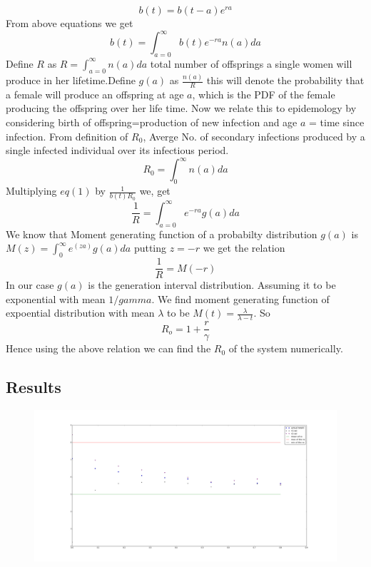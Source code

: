 \documentclass{article}
\begin{document}
$$b(t)=b(t-a)e^{ra}$$
From above equations we get
\begin{equation}
b(t)=\int_{a=0}^{\infty}b(t)e^{-ra}n(a)da
\end{equation}
Define $R$ as
$R=\int_{a=0}^{\infty}n(a)da$ total number of offsprings a single
women will produce in her lifetime.\newline Define $g(a)$ as
$\frac{n(a)}{R}$ this will denote the probability that a female will
produce an offspring at age $a$, which is the PDF of the female
producing the offspring over her life time.  Now we relate this to
epidemology by considering birth of offspring=production of new
infection and age $a$ = time since infection. \newline From definition
of $R_{0}$, Averge No. of secondary infections produced by a single infected
individual over its infectious period.
\begin{equation}
R_{0}=\int_{0}^{\infty}n(a)da
\end{equation}
Multiplying $eq(1)$ by $\frac{1}{b(t)R_{0}}$ we, get
$$\frac{1}{R}=\int_{a=0}^{\infty}e^{-ra}g(a)da$$ We know that Moment
generating function of a probabilty distribution $g(a)$ is
$M(z)=\int_{0}^{\infty}e^(za)g(a)da$ putting $z=-r$ we get the relation
\begin{equation}
  \frac{1}{R}=M(-r)
\end{equation}
In our case $g(a)$ is the generation interval distribution. Assuming
it to be exponential with mean $1/gamma$. We find moment generating
function of expoential distribution with mean $\lambda$ to be
$M(t)=\frac{\lambda}{\lambda-t}$. So
\begin{equation}
  R_{o}=1+\frac{r}{\gamma}
\end{equation}
Hence using the above relation we can find the $R_{0}$ of the system numerically.
\subsection{Results}
\begin{figure}[H]
\includegraphics[width=1.1 \textwidth]{result1}
\end{figure}
\end{document}
